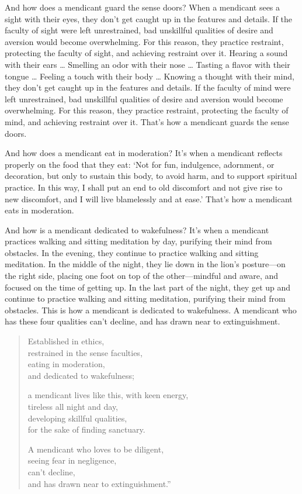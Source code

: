 \documentclass[12pt,openany]{book}%
\begin{document}
And how does a mendicant guard the sense doors? When a mendicant sees a sight with their eyes, they don’t get caught up in the features and details. If the faculty of sight were left unrestrained, bad unskillful qualities of desire and aversion would become overwhelming. For this reason, they practice restraint, protecting the faculty of sight, and achieving restraint over it. Hearing a sound with their ears … Smelling an odor with their nose … Tasting a flavor with their tongue … Feeling a touch with their body … Knowing a thought with their mind, they don’t get caught up in the features and details. If the faculty of mind were left unrestrained, bad unskillful qualities of desire and aversion would become overwhelming. For this reason, they practice restraint, protecting the faculty of mind, and achieving restraint over it. That’s how a mendicant guards the sense doors. 

And how does a mendicant eat in moderation? It’s when a mendicant reflects properly on the food that they eat: ‘Not for fun, indulgence, adornment, or decoration, but only to sustain this body, to avoid harm, and to support spiritual practice. In this way, I shall put an end to old discomfort and not give rise to new discomfort, and I will live blamelessly and at ease.’ That’s how a mendicant eats in moderation. 

And how is a mendicant dedicated to wakefulness? It’s when a mendicant practices walking and sitting meditation by day, purifying their mind from obstacles. In the evening, they continue to practice walking and sitting meditation. In the middle of the night, they lie down in the lion’s posture—on the right side, placing one foot on top of the other—mindful and aware, and focused on the time of getting up. In the last part of the night, they get up and continue to practice walking and sitting meditation, purifying their mind from obstacles. This is how a mendicant is dedicated to wakefulness. A mendicant who has these four qualities can’t decline, and has drawn near to extinguishment. 

\begin{verse}%
Established in ethics, \\
restrained in the sense faculties, \\
eating in moderation, \\
and dedicated to wakefulness; 

a mendicant lives like this, with keen energy, \\
tireless all night and day, \\
developing skillful qualities, \\
for the sake of finding sanctuary. 

A mendicant who loves to be diligent, \\
seeing fear in negligence, \\
can’t decline, \\
and has drawn near to extinguishment.” 

%
\end{verse}
\end{document}
